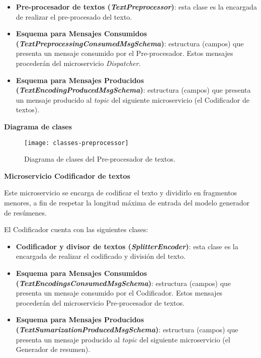 \vspace{-0.2cm}
\begin{itemize} [\textbullet]
	\item \textbf{Pre-procesador de textos (\emph{TextPreprocessor})}: esta clase es la encargada de realizar el pre-procesado del texto.
	
	\item \textbf{Esquema para Mensajes Consumidos \\ (\emph{TextPreprocessingConsumedMsgSchema})}: estructura (campos) que presenta un mensaje consumido por el Pre-procesador. Estos mensajes procederán del microservicio \emph{Dispatcher}.
	
	\item \textbf{Esquema para Mensajes Producidos \\ (\emph{TextEncodingProducedMsgSchema})}: estructura (campos) que presenta un mensaje producido al \emph{topic} del siguiente microservicio (el Codificador de textos).
\end{itemize}

\noindent
\textbf{Diagrama de clases}

\begin{figure}[h]
	\centering
	\texttt{[image: classes-preprocessor]}
	\vspace{-0.5cm}
	\caption{Diagrama de clases del Pre-procesador de textos.}
\end{figure}


\noindent
\textbf{\large Microservicio Codificador de textos}

Este microservicio se encarga de codificar el texto y dividirlo en fragmentos menores, a fin de respetar la longitud máxima de entrada del modelo generador de resúmenes.

El Codificador cuenta con las siguientes clases:

\vspace{-0.2cm}
\begin{itemize} [\textbullet]
	\item \textbf{Codificador y divisor de textos (\emph{SplitterEncoder})}: esta clase es la encargada de realizar el codificado y división del texto.
	
	\item \textbf{Esquema para Mensajes Consumidos \\ (\emph{TextEncodingsConsumedMsgSchema})}: estructura (campos) que presenta un mensaje consumido por el Codificador. Estos mensajes procederán del microservicio Pre-procesador de textos.
	
	\item \textbf{Esquema para Mensajes Producidos \\ (\emph{TextSumarizationProducedMsgSchema})}: estructura (campos) que presenta un mensaje producido al \emph{topic} del siguiente microservicio (el Generador de resumen).
\end{itemize}

